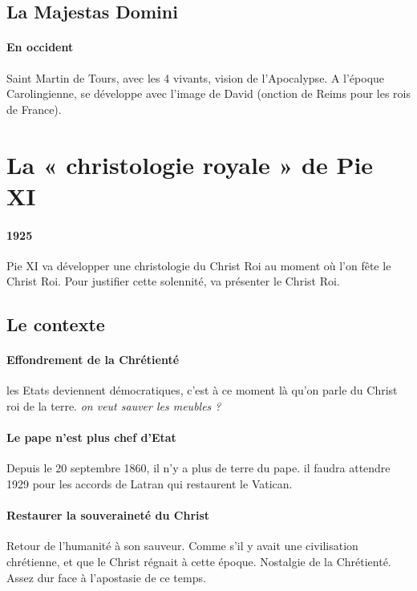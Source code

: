 \subsection{La Majestas Domini}
 

\paragraph{En occident} Saint Martin de Tours, avec les 4 vivants, vision de l'Apocalypse. A l'époque Carolingienne, se développe avec l'image de David (onction de Reims pour les rois de France).

\section{La « christologie royale » de Pie XI }  


\paragraph{1925} Pie XI va développer une christologie du Christ Roi au moment où l'on fête le Christ Roi. Pour justifier cette solennité, va présenter le Christ Roi.

\subsection{Le contexte } 

\paragraph{Effondrement de la Chrétienté} les Etats deviennent démocratiques, c'est à ce moment là qu'on parle du Christ roi de la terre. \textit{on veut sauver les meubles ?}

\paragraph{Le pape n'est plus chef d'Etat} Depuis le 20 septembre 1860, il n'y a plus de terre du pape. il faudra attendre 1929 pour les accords de Latran qui restaurent le Vatican.

\paragraph{Restaurer la souveraineté du Christ} Retour de l'humanité à son sauveur. Comme s'il y avait une civilisation chrétienne, et que le Christ régnait à cette époque. Nostalgie de la Chrétienté. Assez dur face à l'apostasie de ce temps.

